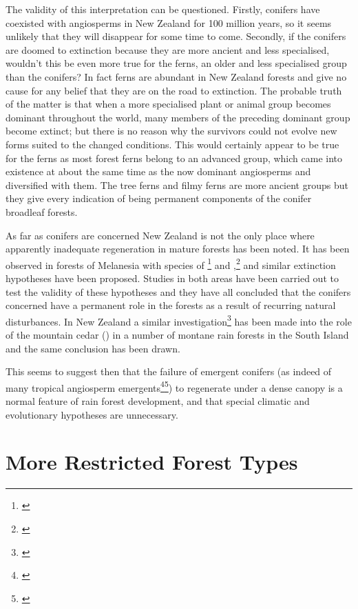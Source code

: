 The validity of this interpretation can be questioned.
Firstly, conifers have coexisted with angiosperms in New Zealand for 100 million years, so it seems unlikely that they will disappear for some time to come.
Secondly, if the conifers are doomed to extinction because they are more ancient and less specialised, wouldn't this be even more true for the ferns, an older and less specialised group than the conifers? In fact ferns are abundant in New Zealand forests and give no cause for any belief that they are on the road to extinction.
The probable truth of the matter is that when a more specialised plant or animal group becomes dominant throughout the world, many members of the preceding dominant group become extinct; but there is no reason why the survivors could not evolve new forms suited to the changed conditions.
This would certainly appear to be true for the ferns as most forest ferns belong to an advanced group, which came into existence at about the same time as the now dominant angiosperms and diversified with them.
The tree ferns and filmy ferns are more ancient groups but they give every indication of being permanent components of the conifer broadleaf forests.

As far as conifers are concerned New Zealand is not the only place where apparently inadequate regeneration in mature forests has been noted.
It has been observed in forests of Melanesia with species of \footnote{\cite{havel1971araucaria}} and ,\footnote{\cite{whitmore1966social}} and similar extinction hypotheses have been proposed.
Studies in both areas have been carried out to test the validity of these hypotheses and they have all concluded that the conifers concerned have a permanent role in the forests as a result of recurring natural disturbances.
In New Zealand a similar investigation\footnote{\cite{veblen1982conifer}} has been made into the role of the mountain cedar () in a number of montane rain forests in the South Island and the same conclusion has been drawn.

This seems to suggest then that the failure of emergent conifers (as indeed of many tropical angiosperm emergents\footnote{\cite{whitmore1975tropical}}\footnote{\cite{jones1956ecological}}) to regenerate under a dense canopy is a normal feature of rain forest development, and that special climatic and evolutionary hypotheses are unnecessary.

\section{More Restricted Forest Types}

